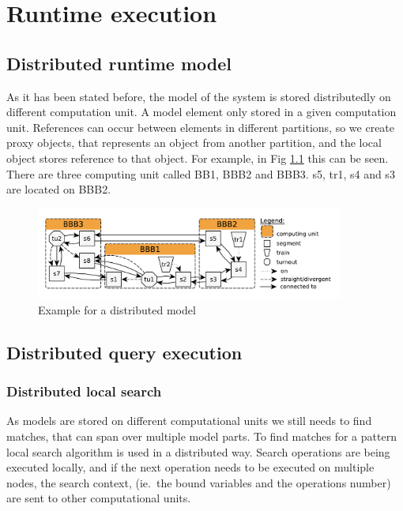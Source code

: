 %
\chapter{Runtime execution}
%


\section{Distributed runtime model}

As it has been stated before, the model of the system is stored distributedly on different computation unit. A model element only stored in a given computation unit. References can occur between elements in different partitions, so we create proxy objects, that represents an object from another partition, and the local object stores reference to that object. For example, in Fig \ref{fig:distrib-model-example} this can be seen. There are three computing unit called BB1, BBB2 and BBB3. s5, tr1, s4 and s3 are located on BBB2. 

\begin{figure}[h]
	\begin{center}
		\includegraphics[width=0.9\textwidth]{figures/runtime-snapshot.pdf}
		\caption{Example for a distributed model}
		\label{fig:distrib-model-example}
	\end{center}
\end{figure}




\section{Distributed query execution}


\subsection{Distributed local search}

As models are stored on different computational units we still needs to find matches, that can span over multiple model parts. To find matches for a pattern local search algorithm is used in a distributed way. Search operations are being executed locally, and if the next operation needs to be executed on multiple nodes, the search context, (ie.\ the bound variables and the operations number) are sent to other computational units.

